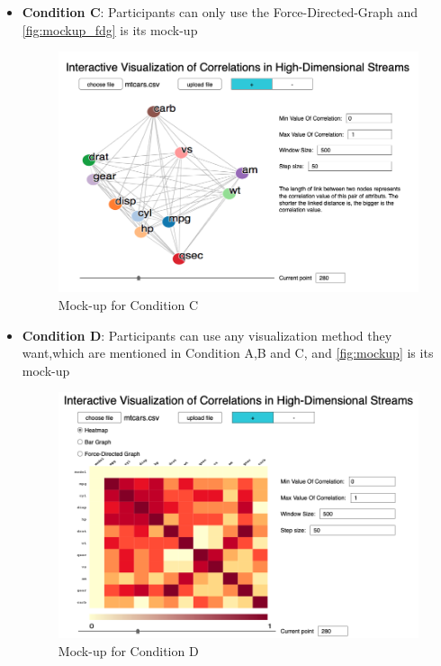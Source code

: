 \begin{itemize}
	\item \textbf{Condition C}: Participants can only use the Force-Directed-Graph and \autoref{fig:mockup_fdg} is its mock-up
	\begin{figure}[htb]
		\centering
		\includegraphics[width=15cm]{pictures/mockup_fdg}
		\caption{Mock-up for Condition C}
		\label{fig:mockup_fdg}
	\end{figure}
	
	\item \textbf{Condition D}: Participants can use any visualization method they want,which are mentioned in Condition A,B and C, and \autoref{fig:mockup} is its mock-up
		\begin{figure}[htb]
		\centering
		\includegraphics[width=15cm]{pictures/mockup_3}
		\caption{Mock-up for Condition D}
		\label{fig:mockup_3}
	\end{figure}
\end{itemize}

